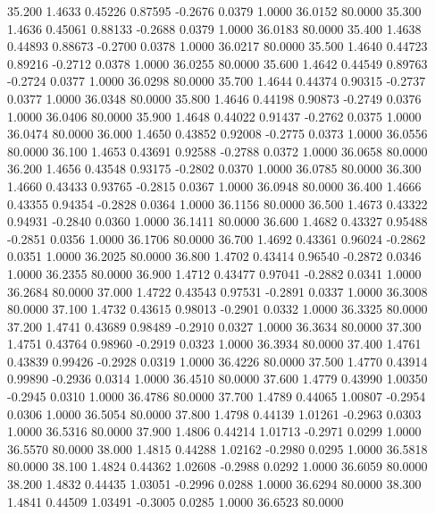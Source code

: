   35.200   1.4633   0.45226   0.87595  -0.2676   0.0379   1.0000  36.0152  80.0000
  35.300   1.4636   0.45061   0.88133  -0.2688   0.0379   1.0000  36.0183  80.0000
  35.400   1.4638   0.44893   0.88673  -0.2700   0.0378   1.0000  36.0217  80.0000
  35.500   1.4640   0.44723   0.89216  -0.2712   0.0378   1.0000  36.0255  80.0000
  35.600   1.4642   0.44549   0.89763  -0.2724   0.0377   1.0000  36.0298  80.0000
  35.700   1.4644   0.44374   0.90315  -0.2737   0.0377   1.0000  36.0348  80.0000
  35.800   1.4646   0.44198   0.90873  -0.2749   0.0376   1.0000  36.0406  80.0000
  35.900   1.4648   0.44022   0.91437  -0.2762   0.0375   1.0000  36.0474  80.0000
  36.000   1.4650   0.43852   0.92008  -0.2775   0.0373   1.0000  36.0556  80.0000
  36.100   1.4653   0.43691   0.92588  -0.2788   0.0372   1.0000  36.0658  80.0000
  36.200   1.4656   0.43548   0.93175  -0.2802   0.0370   1.0000  36.0785  80.0000
  36.300   1.4660   0.43433   0.93765  -0.2815   0.0367   1.0000  36.0948  80.0000
  36.400   1.4666   0.43355   0.94354  -0.2828   0.0364   1.0000  36.1156  80.0000
  36.500   1.4673   0.43322   0.94931  -0.2840   0.0360   1.0000  36.1411  80.0000
  36.600   1.4682   0.43327   0.95488  -0.2851   0.0356   1.0000  36.1706  80.0000
  36.700   1.4692   0.43361   0.96024  -0.2862   0.0351   1.0000  36.2025  80.0000
  36.800   1.4702   0.43414   0.96540  -0.2872   0.0346   1.0000  36.2355  80.0000
  36.900   1.4712   0.43477   0.97041  -0.2882   0.0341   1.0000  36.2684  80.0000
  37.000   1.4722   0.43543   0.97531  -0.2891   0.0337   1.0000  36.3008  80.0000
  37.100   1.4732   0.43615   0.98013  -0.2901   0.0332   1.0000  36.3325  80.0000
  37.200   1.4741   0.43689   0.98489  -0.2910   0.0327   1.0000  36.3634  80.0000
  37.300   1.4751   0.43764   0.98960  -0.2919   0.0323   1.0000  36.3934  80.0000
  37.400   1.4761   0.43839   0.99426  -0.2928   0.0319   1.0000  36.4226  80.0000
  37.500   1.4770   0.43914   0.99890  -0.2936   0.0314   1.0000  36.4510  80.0000
  37.600   1.4779   0.43990   1.00350  -0.2945   0.0310   1.0000  36.4786  80.0000
  37.700   1.4789   0.44065   1.00807  -0.2954   0.0306   1.0000  36.5054  80.0000
  37.800   1.4798   0.44139   1.01261  -0.2963   0.0303   1.0000  36.5316  80.0000
  37.900   1.4806   0.44214   1.01713  -0.2971   0.0299   1.0000  36.5570  80.0000
  38.000   1.4815   0.44288   1.02162  -0.2980   0.0295   1.0000  36.5818  80.0000
  38.100   1.4824   0.44362   1.02608  -0.2988   0.0292   1.0000  36.6059  80.0000
  38.200   1.4832   0.44435   1.03051  -0.2996   0.0288   1.0000  36.6294  80.0000
  38.300   1.4841   0.44509   1.03491  -0.3005   0.0285   1.0000  36.6523  80.0000
